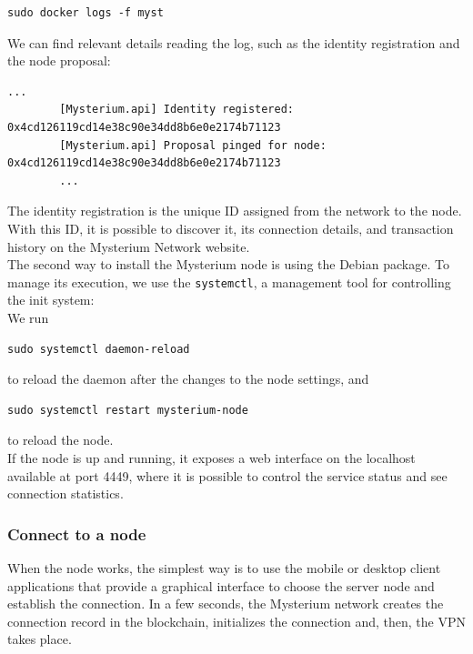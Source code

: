 \documentclass[12pt]{article}
\begin{document}
	\begin{lstlisting}[frame=single]
		sudo docker logs -f myst
	\end{lstlisting}
	
	We can find relevant details reading the log, such as the identity registration and the node proposal:
	\begin{lstlisting}[frame=single]
		...
		[Mysterium.api] Identity registered: 0x4cd126119cd14e38c90e34dd8b6e0e2174b71123
		[Mysterium.api] Proposal pinged for node: 0x4cd126119cd14e38c90e34dd8b6e0e2174b71123
		...
	\end{lstlisting}

	The identity registration is the unique ID assigned from the network to the node. With this ID, it is possible to discover it, its connection details, and transaction history on the Mysterium Network website.\\
	
	
	The second way to install the Mysterium node is using the Debian package. To manage its execution, we use the \lstinline{systemctl}, a management tool for controlling the init system:\\
	We run 

	\begin{lstlisting}[frame=single]
		sudo systemctl daemon-reload
	\end{lstlisting}

	to reload the daemon after the changes to the node settings, and 
	
	\begin{lstlisting}[frame=single]
		sudo systemctl restart mysterium-node
	\end{lstlisting}
	
	to reload the node.\\

	If the node is up and running, it exposes a web interface on the localhost available at port 4449, where it is possible to control the service status and see connection statistics.
	
	\subsubsection{Connect to a node}

	When the node works, the simplest way is to use the mobile or desktop client applications that provide a graphical interface to choose the server node and establish the connection. In a few seconds, the Mysterium network creates the connection record in the blockchain, initializes the connection and, then, the VPN takes place.\\
\end{document}
